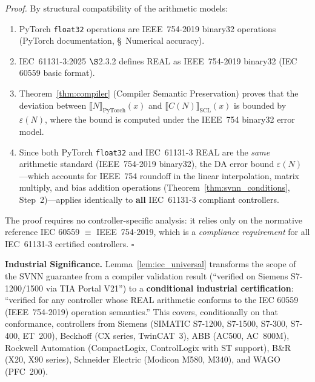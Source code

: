 \vspace{2pt}
\noindent\textit{Proof.}
By structural compatibility of the arithmetic models:

\begin{enumerate}[label=(\roman*)]
    \item PyTorch \texttt{float32} operations are IEEE~754-2019 binary32
    operations (PyTorch documentation, \S~Numerical accuracy).
    \item IEC~61131-3:2025 $\S$2.3.2 defines REAL as IEEE~754-2019 binary32
    (IEC 60559 basic format).
    \item Theorem~\ref{thm:compiler} (Compiler Semantic Preservation) proves
    that the deviation between $\llbracket N \rrbracket_{\text{PyTorch}}(x)$
    and $\llbracket C(N) \rrbracket_{\text{SCL}}(x)$ is bounded by
    $\varepsilon(N)$, where the bound is computed under the IEEE~754
    binary32 error model.
    \item Since both PyTorch \texttt{float32} and IEC~61131-3 REAL are
    the \textit{same} arithmetic standard (IEEE~754-2019 binary32),
    the DA error bound $\varepsilon(N)$---which accounts for
    IEEE~754 roundoff in the linear interpolation, matrix multiply,
    and bias addition operations (Theorem~\ref{thm:svnn_conditions},
    Step~2)---applies identically to \textbf{all} IEC~61131-3
    compliant controllers.
\end{enumerate}

The proof requires no controller-specific analysis: it relies only on the
normative reference IEC 60559 $\equiv$ IEEE~754-2019, which is a
\textit{compliance requirement} for all IEC~61131-3 certified controllers.
\hfill $\square$

\vspace{4pt}
\noindent\textbf{Industrial Significance.}
Lemma~\ref{lem:iec_universal} transforms the scope of the SVNN guarantee
from a compiler validation result (``verified on Siemens S7-1200/1500
via TIA Portal V21'') to a \textbf{conditional industrial certification}:
``verified for any controller whose REAL arithmetic conforms to the
IEC 60559 (IEEE~754-2019) operation semantics.'' This covers, conditionally
on that conformance, controllers from Siemens (SIMATIC S7-1200, S7-1500,
S7-300, S7-400, ET~200), Beckhoff (CX series, TwinCAT~3), ABB (AC500,
AC~800M), Rockwell Automation (CompactLogix, ControlLogix with ST support),
B\&R (X20, X90 series), Schneider Electric (Modicon M580, M340), and WAGO
(PFC~200).

